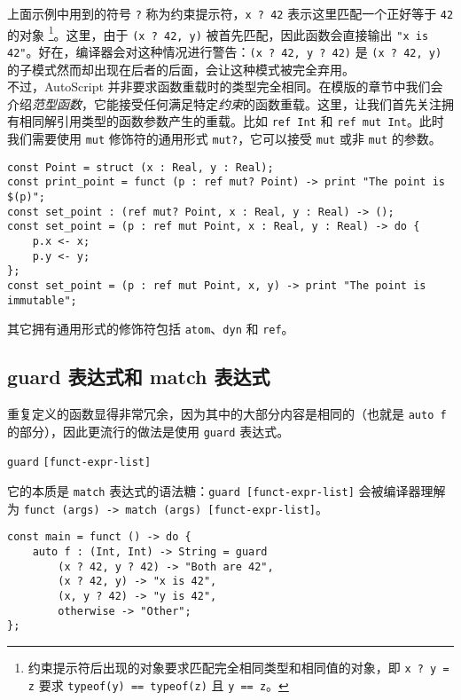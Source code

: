 上面示例中用到的符号 \lstinline!?! 称为约束提示符，\lstinline!x ? 42! 表示这里匹配一个正好等于 \lstinline!42! 的对象 \footnote{约束提示符后出现的对象要求匹配完全相同类型和相同值的对象，即 \lstinline!x ? y = z! 要求 \lstinline!typeof(y) == typeof(z)! 且 \lstinline!y == z!。}。这里，由于 \lstinline!(x ? 42, y)! 被首先匹配，因此函数会直接输出 \lstinline!"x is 42"!。好在，编译器会对这种情况进行警告：\lstinline!(x ? 42, y ? 42)! 是 \lstinline!(x ? 42, y)! 的子模式然而却出现在后者的后面，会让这种模式被完全弃用。 \\

不过，AutoScript 并非要求函数重载时的类型完全相同。在模版的章节中我们会介绍\emph{范型函数}，它能接受任何满足特定\emph{约束}的函数重载。这里，让我们首先关注拥有相同解引用类型的函数参数产生的重载。比如 \lstinline!ref Int! 和 \lstinline!ref mut Int!。此时我们需要使用 \lstinline!mut! 修饰符的通用形式 \lstinline!mut?!，它可以接受 \lstinline!mut! 或非 \lstinline!mut! 的参数。

\begin{lstlisting}
const Point = struct (x : Real, y : Real);
const print_point = funct (p : ref mut? Point) -> print "The point is $(p)";
const set_point : (ref mut? Point, x : Real, y : Real) -> ();
const set_point = (p : ref mut Point, x : Real, y : Real) -> do {
	p.x <- x;
	p.y <- y;
};
const set_point = (p : ref mut Point, x, y) -> print "The point is immutable";
\end{lstlisting}

其它拥有通用形式的修饰符包括 \lstinline!atom!、\lstinline!dyn! 和 \lstinline!ref!。

\subsection{guard 表达式和 match 表达式}

重复定义的函数显得非常冗余，因为其中的大部分内容是相同的（也就是 \lstinline!auto f! 的部分），因此更流行的做法是使用 \lstinline!guard! 表达式。

\begin{grammar}
	\lstinline!guard! \texttt{[funct-expr-list]}
\end{grammar}

它的本质是 \lstinline!match! 表达式的语法糖：\texttt{guard [funct-expr-list]} 会被编译器理解为 \texttt{funct (args) -> match (args) [funct-expr-list]}。

\begin{lstlisting}
const main = funct () -> do {
    auto f : (Int, Int) -> String = guard
        (x ? 42, y ? 42) -> "Both are 42",
        (x ? 42, y) -> "x is 42",
        (x, y ? 42) -> "y is 42",
        otherwise -> "Other";
};
\end{lstlisting}

